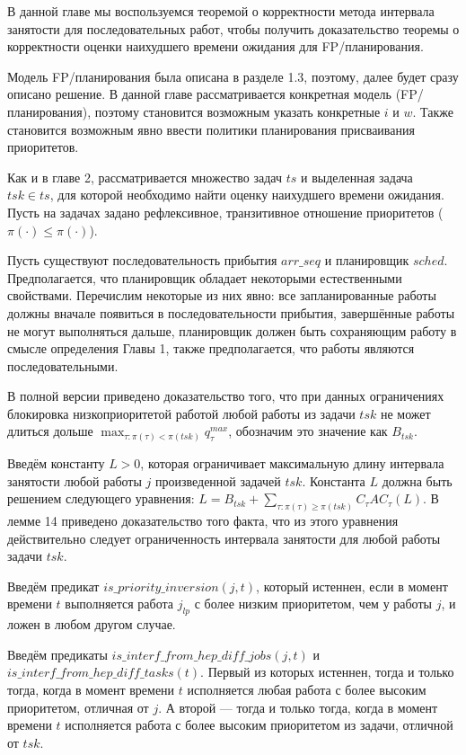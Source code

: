 В данной главе мы воспользуемся теоремой о корректности метода интервала занятости для
  последовательных работ, чтобы получить доказательство теоремы о корректности
  оценки наихудшего времени ожидания для FP\-/планирования.

Модель FP\-/планирования была описана в разделе 1.3, поэтому, далее будет сразу описано
  решение. В данной главе рассматривается конкретная модель (FP\-/планирования), поэтому
  становится возможным указать конкретные $i$ и $w$. Также становится возможным явно
  ввести политики планирования присваивания приоритетов.

Как и в главе 2, рассматривается множество задач $ts$ и выделенная задача $tsk \in ts$,
  для которой необходимо найти оценку наихудшего времени ожидания. Пусть на
  задачах задано рефлексивное, транзитивное отношение приоритетов ($\pi(\cdot) \leq \pi(\cdot)$).

Пусть существуют последовательность прибытия $arr\_seq$ и планировщик $sched$.
  Предполагается, что планировщик обладает некоторыми естественными свойствами.
  Перечислим некоторые из них явно:
    все запланированные работы должны вначале появиться в последовательности прибытия,
    завершённые работы не могут выполняться дальше,
    планировщик должен быть сохраняющим работу в смысле определения Главы 1,
    также предполагается, что работы являются последовательными.

В полной версии приведено доказательство того, что при данных ограничениях
  блокировка низкоприоритетой работой любой работы
  из задачи $tsk$ не может длиться дольше $\max_{\tau:\pi(\tau) < \pi(tsk)} q_{\tau}^{max}$,
  обозначим это значение как $B_{tsk}$.

Введём константу $L > 0$, которая ограничивает максимальную длину интервала занятости
  любой работы $j$ произведенной задачей $tsk$. Константа $L$ должна быть решением
  следующего уравнения: $L = B_{tsk} + \sum_{\tau: \pi(\tau) \geq \pi(tsk)} C_{\tau}AC_{\tau}(L)$.
  В лемме 14 приведено доказательство того факта, что из этого уравнения действительно следует
  ограниченность интервала занятости для любой работы задачи $tsk$.

Введём предикат $is\_priority\_inversion(j, t)$, который истеннен, если
  в момент времени $t$ выполняется работа $j_{lp}$ с более низким приоритетом, чем у работы $j$,
  и ложен в любом другом случае.

Введём предикаты $is\_interf\_from\_hep\_diff\_jobs(j,t)$ и $is\_interf\_from\_hep\_diff\_tasks(t)$.
  Первый из которых истеннен, тогда и только тогда, когда в момент времени $t$ исполняется
  любая работа с более высоким приоритетом, отличная от $j$. А второй --- тогда и только тогда, когда
  в момент времени $t$ исполняется работа с более высоким приоритетом из задачи, отличной от $tsk$.

